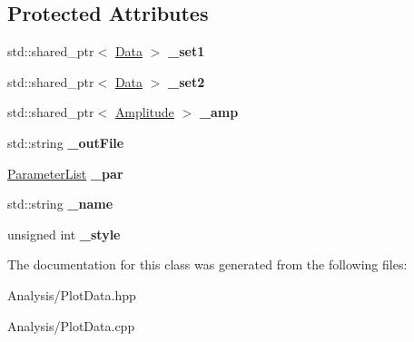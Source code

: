\subsection*{Protected Attributes}
\begin{DoxyCompactItemize}
\item 
\hypertarget{classplot_data_a3fc73f2054a86197c3853f2b7806c912}{std\-::shared\-\_\-ptr$<$ \hyperlink{class_data}{Data} $>$ {\bfseries \-\_\-set1}}\label{classplot_data_a3fc73f2054a86197c3853f2b7806c912}

\item 
\hypertarget{classplot_data_a3a4abf7e6a937948fd7ceff7418abbdc}{std\-::shared\-\_\-ptr$<$ \hyperlink{class_data}{Data} $>$ {\bfseries \-\_\-set2}}\label{classplot_data_a3a4abf7e6a937948fd7ceff7418abbdc}

\item 
\hypertarget{classplot_data_a9847a784e4e3a88da706da2bdf93bb1b}{std\-::shared\-\_\-ptr$<$ \hyperlink{class_amplitude}{Amplitude} $>$ {\bfseries \-\_\-amp}}\label{classplot_data_a9847a784e4e3a88da706da2bdf93bb1b}

\item 
\hypertarget{classplot_data_a71e2bd6e398f6d1f70be6922f3b4ef0d}{std\-::string {\bfseries \-\_\-out\-File}}\label{classplot_data_a71e2bd6e398f6d1f70be6922f3b4ef0d}

\item 
\hypertarget{classplot_data_abc2dd6a61abebf0184e145a962cdf4ba}{\hyperlink{class_parameter_list}{Parameter\-List} {\bfseries \-\_\-par}}\label{classplot_data_abc2dd6a61abebf0184e145a962cdf4ba}

\item 
\hypertarget{classplot_data_ab7c80e2963f04436d12ea040aa9f0743}{std\-::string {\bfseries \-\_\-name}}\label{classplot_data_ab7c80e2963f04436d12ea040aa9f0743}

\item 
\hypertarget{classplot_data_adb3081c43f500ad619208923b9e4a89d}{unsigned int {\bfseries \-\_\-style}}\label{classplot_data_adb3081c43f500ad619208923b9e4a89d}

\end{DoxyCompactItemize}


The documentation for this class was generated from the following files\-:\begin{DoxyCompactItemize}
\item 
Analysis/Plot\-Data.\-hpp\item 
Analysis/Plot\-Data.\-cpp\end{DoxyCompactItemize}
